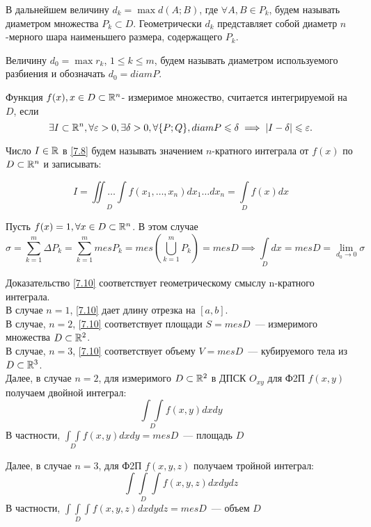 \documentclass[../../main.tex]{subfiles}
\begin{document}
В дальнейшем величину $d_k = \max d(A; B)$, где $ \forall A, B \in P_k$,
будем называть диаметром множества $P_k \subset D$. 
Геометрически $d_k$ представляет собой диаметр $n$-мерного шара
наименьшего размера, содержащего $P_k$.

Величину ${d_0 = \max r_k}$, ${1 \le k \le m}$, 
будем называть диаметром используемого разбиения и
обозначать $d_0 = diam P$.

Функция $f(x), x \in D \subset \mathbb{R}^n$- измеримое
множество, считается интегрируемой на $D$, если
\begin{equation}
\label{7.8}
\exists I \subset \mathbb{R}^n,
\forall \varepsilon > 0, \exists \delta > 0, \forall \{P; Q\},
diam P \leqslant \delta \implies \left|{I  - \delta}\right| \leqslant \varepsilon.
\end{equation}

Число $ I \in \mathbb{R} $ в \eqref{7.8}
будем называть значением $n$-кратного интеграла от 
$f(x)$ по $D \subset \mathbb{R}^n$ и записывать:

\begin{equation}
	I = \underset{D}{\iint\ldots\int} f(x_1, \ldots, x_n) d x_1 \ldots dx_n =
	 \int\limits_{D}f(x)dx
\end{equation}


\begin{example}
	Пусть $f(x) = 1, \forall x \in D \subset \mathbb{R}^n$. В этом случае \\
	\begin{equation}
	\label{7.10}
	\sigma = \sum\limits_{k = 1}^m\Delta{P_k} = 
	\sum\limits_{k=1}^mmesP_k = mes(\bigcup\limits_{k = 1}^m P_k) = mesD
	\implies \int\limits_D dx = mesD = \lim\limits_{d_0 \to 0} \sigma
	\end{equation}
	
	Доказательство \eqref{7.10} соответствует 
	геометрическому смыслу n-кратного интеграла.\\
	
	В случае $n = 1$, \eqref{7.10} дает длину отрезка на $[a, b]$.\\
	В случае, $n = 2$, \eqref{7.10} соответствует площади $S = mesD$~--- 
	измеримого множества $D \subset \mathbb{R}^2$.\\
	В случае, $n = 3$, \eqref{7.10} соответствует объему $V = mesD$~---
	кубируемого тела из $D \subset \mathbb{R}^3$.\\
	
	Далее, в случае $n=2$, для измеримого $D \subset \mathbb{R}^2$ в ДПСК 
	$O_{xy}$ для Ф2П $f(x, y)$ получаем двойной интеграл:
	\[
		\underset{D}{\int\int}f(x, y)dxdy
	\]
	В частности, $\underset{D}{\int\int}f(x,y)dxdy = mesD$~--- площадь $D$ 
	
	Далее, в случае $n=3$, для Ф2П $f(x, y, z)$ получаем тройной интеграл:
	\[
	\underset{D}{\int\int\int}f(x,y,z)dxdydz
	\]
	В частности, $\underset{D}{\int\int\int}f(x,y,z)dxdydz = mesD$~--- объем $D$ 
\end{example}
\end{document}
